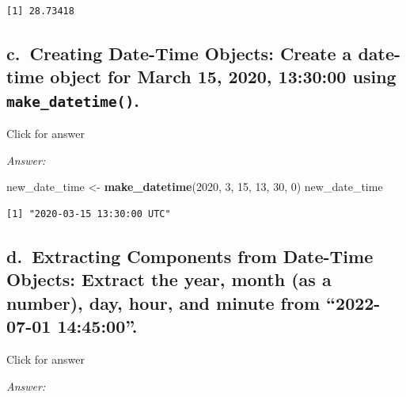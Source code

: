 \documentclass[
]{book}
\newenvironment{Shaded}{\begin{snugshade}}{\end{snugshade}}
\newcommand{\DecValTok}[1]{\textcolor[rgb]{0.00,0.00,0.81}{#1}}
\newcommand{\FunctionTok}[1]{\textcolor[rgb]{0.13,0.29,0.53}{\textbf{#1}}}
\newcommand{\NormalTok}[1]{#1}
\newcommand{\OtherTok}[1]{\textcolor[rgb]{0.56,0.35,0.01}{#1}}
\begin{document}
\begin{verbatim}
[1] 28.73418
\end{verbatim}

\hypertarget{c.-creating-date-time-objects-create-a-date-time-object-for-march-15-2020-133000-using-make_datetime.}{%
\subsection{\texorpdfstring{c.~Creating Date-Time Objects: Create a date-time object for March 15, 2020, 13:30:00 using \texttt{make\_datetime()}.}{c.~Creating Date-Time Objects: Create a date-time object for March 15, 2020, 13:30:00 using make\_datetime().}}\label{c.-creating-date-time-objects-create-a-date-time-object-for-march-15-2020-133000-using-make_datetime.}}

Click for answer

\emph{Answer:}

\begin{Shaded}
\begin{Highlighting}[]
\NormalTok{new\_date\_time }\OtherTok{\textless{}{-}} \FunctionTok{make\_datetime}\NormalTok{(}\DecValTok{2020}\NormalTok{, }\DecValTok{3}\NormalTok{, }\DecValTok{15}\NormalTok{, }\DecValTok{13}\NormalTok{, }\DecValTok{30}\NormalTok{, }\DecValTok{0}\NormalTok{)}
\NormalTok{new\_date\_time}
\end{Highlighting}
\end{Shaded}

\begin{verbatim}
[1] "2020-03-15 13:30:00 UTC"
\end{verbatim}

\hypertarget{d.-extracting-components-from-date-time-objects-extract-the-year-month-as-a-number-day-hour-and-minute-from-2022-07-01-144500.}{%
\subsection{d.~Extracting Components from Date-Time Objects: Extract the year, month (as a number), day, hour, and minute from ``2022-07-01 14:45:00''.}\label{d.-extracting-components-from-date-time-objects-extract-the-year-month-as-a-number-day-hour-and-minute-from-2022-07-01-144500.}}

Click for answer

\emph{Answer:}
\end{document}

